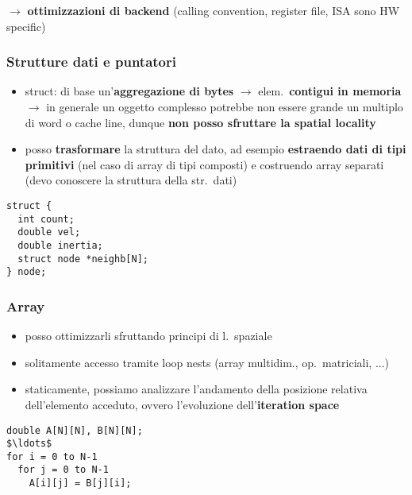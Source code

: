 $\rightarrow$ \textbf{ottimizzazioni di backend} (calling convention, register file, ISA sono HW specific)

\subsubsection{Strutture dati e puntatori}

\noindent\begin{minipage}[c]{.6\textwidth}
  \begin{itemize}
    \item struct: di base un'\textbf{aggregazione di bytes} $\rightarrow$ elem.~\textbf{contigui in memoria} $\rightarrow$ in generale un oggetto complesso potrebbe non essere grande un multiplo di word o cache line, dunque \textbf{non posso sfruttare la spatial locality}
    \item posso \textbf{trasformare} la struttura del dato, ad esempio \textbf{estraendo dati di tipi primitivi} (nel caso di array di tipi composti) e costruendo array separati (devo conoscere la struttura della str.~dati)
\end{itemize}
\end{minipage}
\hfill
\begin{minipage}[c]{.35\textwidth}
\begin{lstlisting}
struct {
  int count;
  double vel;
  double inertia;
  struct node *neighb[N];
} node;\end{lstlisting}
\end{minipage}


\subsubsection{Array}


\noindent\begin{minipage}[c]{.6\textwidth}
\begin{itemize}
  \item posso ottimizzarli sfruttando principi di l.~spaziale
  \item solitamente accesso tramite loop nests (array multidim., op.~matriciali, ...)
  \item staticamente, possiamo analizzare l'andamento della posizione relativa dell'elemento acceduto, ovvero l'evoluzione dell'\textbf{iteration space}

\end{itemize}
\end{minipage}
\hfill
\begin{minipage}[c]{.35\textwidth}
\begin{lstlisting}
double A[N][N], B[N][N];
$\ldots$
for i = 0 to N-1
  for j = 0 to N-1
    A[i][j] = B[j][i];\end{lstlisting}

\end{minipage}

